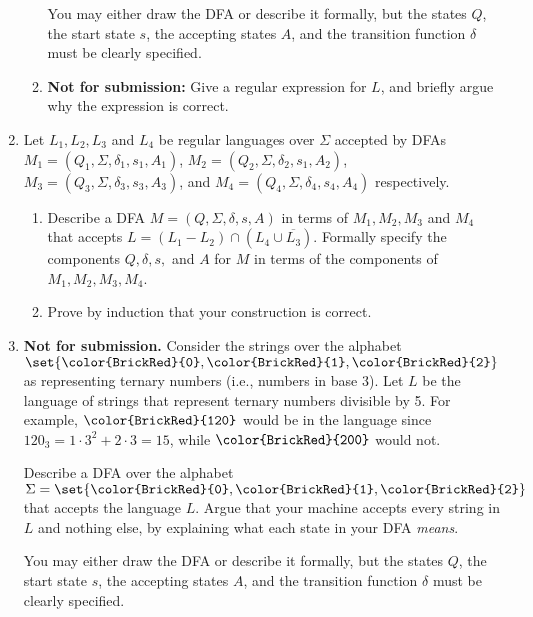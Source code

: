 \documentclass[11pt]{article}
\def\Sym#1{\texttt{\upshape \color{BrickRed} {#1}}}
\begin{document}
\begin{enumerate}
\begin{enumerate}
  You may either draw the DFA or describe it formally, but the states
  $Q$, the start state $s$, the accepting states $A$, and the
  transition function $\delta$ must be clearly specified.

\item {\bf Not for submission:} Give a regular expression for $L$, and briefly argue why the expression is correct.
\end{enumerate}





\item Let $L_1, L_2,L_3$ and $L_4$ be regular languages over $\Sigma$
  accepted by DFAs $M_1 = (Q_1, \Sigma, \delta_1, s_1, A_1)$,
  $M_2 = (Q_2, \Sigma, \delta_2, s_1, A_2)$, $M_3 = (Q_3,
  \Sigma, \delta_3, s_3, A_3)$, and $M_4 = (Q_4,
  \Sigma, \delta_4, s_4, A_4)$ respectively.

\begin{enumerate}
\item Describe a DFA $M = (Q, \Sigma, \delta, s, A)$ in terms of $M_1,
  M_2,M_3$ and $M_4$ that accepts $L = (L_1 - L_2) \cap (L_4 \cup \overline{L_3})$.  Formally specify the components $Q, \delta, s,$ and $A$
  for $M$ in terms of the components of $M_1, M_2,M_3, M_4$.
\item Prove by induction that your construction is correct.
\end{enumerate}

\item {\bf Not for submission.} Consider the strings over the alphabet $\set{\Sym0,\Sym1,\Sym{2}}$ as
representing ternary numbers (i.e., numbers in base 3). Let $L$ be the language
of strings that represent ternary numbers divisible by 5. For example, $\Sym{120}$
would be in the language since $120_3 =
1\cdot 3^2 + 2 \cdot 3 = 15$, while $\Sym{200}$ would not.

Describe a DFA over the alphabet $\Sigma = \set{\Sym0,\Sym1,\Sym{2}}$ that accepts the language $L$.
Argue that your machine accepts every string in $L$ and nothing else, by explaining what each state in your DFA \emph{means}.

You may either draw the DFA or describe it formally, but the states $Q$, the start state $s$, the accepting states $A$, and the transition function $\delta$ must be clearly specified.


\end{enumerate}
\end{document}
